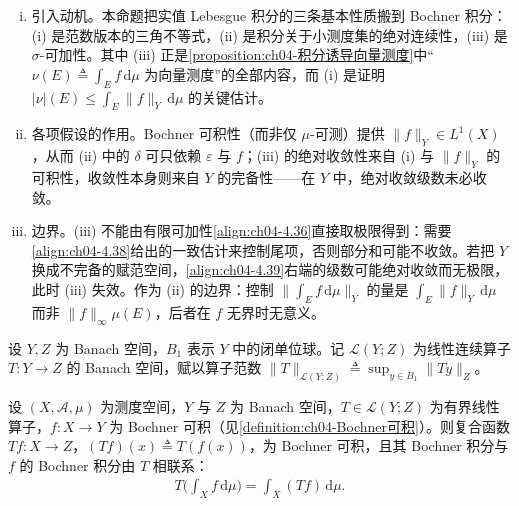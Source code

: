 \documentclass[../../main.tex]{subfiles}%
\begin{document}
\begin{remark}\label{remark:ch04-Bochner性质动机}
\begin{enumerate}[(i)]
\item 引入动机。本命题把实值 Lebesgue 积分的三条基本性质搬到 Bochner 积分：(i) 是范数版本的三角不等式，(ii) 是积分关于小测度集的绝对连续性，(iii) 是 $\sigma$-可加性。其中 (iii) 正是\cref{proposition:ch04-积分诱导向量测度}中“$\nu(E)\triangleq\int_Ef\,\mathrm{d}\mu$ 为向量测度”的全部内容，而 (i) 是证明 $|\nu|(E)\leqslant\int_E\|f\|_Y\,\mathrm{d}\mu$ 的关键估计。

\item 各项假设的作用。Bochner 可积性（而非仅 $\mu$-可测）提供 $\|f\|_Y\in L^1(X)$，从而 (ii) 中的 $\delta$ 可只依赖 $\varepsilon$ 与 $f$；(iii) 的绝对收敛性来自 (i) 与 $\|f\|_Y$ 的可积性，收敛性本身则来自 $Y$ 的完备性——在 $Y$ 中，绝对收敛级数未必收敛。

\item 边界。(iii) 不能由有限可加性\eqref{align:ch04-4.36}直接取极限得到：需要\eqref{align:ch04-4.38}给出的一致估计来控制尾项，否则部分和可能不收敛。若把 $Y$ 换成不完备的赋范空间，\eqref{align:ch04-4.39}右端的级数可能绝对收敛而无极限，此时 (iii) 失效。作为 (ii) 的边界：控制 $\|\int_Ef\,\mathrm{d}\mu\|_Y$ 的量是 $\int_E\|f\|_Y\,\mathrm{d}\mu$ 而非 $\|f\|_\infty\mu(E)$，后者在 $f$ 无界时无意义。
\end{enumerate}
\end{remark}

设 $Y,Z$ 为 Banach 空间，$B_1$ 表示 $Y$ 中的闭单位球。记 $\mathcal{L}(Y;Z)$ 为线性连续算子 $T:Y\to Z$ 的 Banach 空间，赋以算子范数 $\|T\|_{\mathcal{L}(Y;Z)}\triangleq \sup_{y\in B_1}\|Ty\|_Z$。

\begin{proposition}\label{proposition:ch04-算子交换积分}
设 $(X,\mathcal{A},\mu)$ 为测度空间，$Y$ 与 $Z$ 为 Banach 空间，$T\in\mathcal{L}(Y;Z)$ 为有界线性算子，$f:X\to Y$ 为 Bochner 可积（见\cref{definition:ch04-Bochner可积}）。则复合函数 $Tf:X\to Z$，$(Tf)(x)\triangleq T(f(x))$，为 Bochner 可积，且其 Bochner 积分与 $f$ 的 Bochner 积分由 $T$ 相联系：
\begin{align}
T\Big(\int_X f\,\mathrm{d}\mu\Big)=\int_X(Tf)\,\mathrm{d}\mu. \label{align:ch04-4.41}
\end{align}
\end{proposition}
\end{document}
